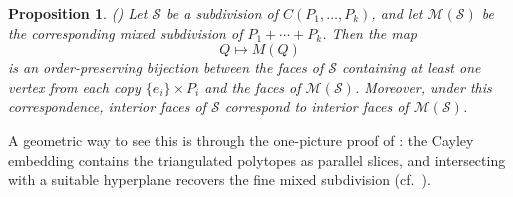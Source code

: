 \documentclass[12pt, reqno]{amsart}
\theoremstyle{plain}
\newtheorem{proposition}[theorem]{Proposition}
\theoremstyle{definition}
\numberwithin{equation}{section}
\begin{document}
\begin{proposition}
\label{prop_Cayley_mixedsubdivision}
(\cite{HuberRambauSantos_CayleyTrick_2000}) Let $\mathcal{S}$ be a subdivision of $C(P_1,\ldots,P_k)$, and let $\mathcal{M}(\mathcal{S})$ be the corresponding mixed subdivision of $P_1+\cdots+P_k$. Then the map
\[
Q\longmapsto M(Q)
\]
is an order-preserving bijection between the faces of $\mathcal{S}$ containing at least one vertex from each copy $\{e_i\}\times P_i$ and the faces of $\mathcal{M}(\mathcal{S})$. Moreover, under this correspondence, interior faces of $\mathcal{S}$ correspond to interior faces of $\mathcal{M}(\mathcal{S})$.
\end{proposition}



A geometric way to see this is through the one-picture proof of \cite{HuberRambauSantos_CayleyTrick_2000}: the Cayley embedding contains the triangulated polytopes as parallel slices, and intersecting with a suitable hyperplane recovers the fine mixed subdivision (cf.~).
\end{document}
